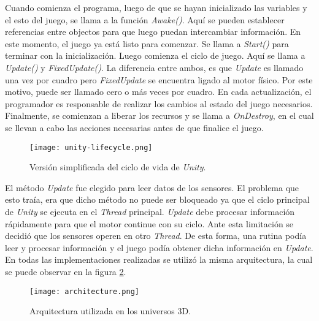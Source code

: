  Cuando comienza el programa, luego de que se hayan inicializado las variables y el esto del juego, se llama a la función \emph{Awake()}. Aquí se pueden establecer referencias entre objectos para que luego puedan intercambiar información. En este momento, el juego ya está listo para comenzar. Se llama a \emph{Start()} para terminar con la inicialización. Luego comienza el ciclo de juego. Aquí se llama a \emph{Update()} y \emph{FixedUpdate()}. La diferencia entre ambos, es que \emph{Update} es llamado una vez por cuadro pero \emph{FixedUpdate} se encuentra ligado al motor físico. Por este motivo, puede ser llamado cero o más veces por cuadro. En cada actualización, el programador es responsable de realizar los cambios al estado del juego necesarios. Finalmente, se comienzan a liberar los recursos y se llama a \emph{OnDestroy}, en el cual se llevan a cabo las acciones necesarias antes de que finalice el juego.

 \begin{figure}[H]
	\centering
    \texttt{[image: unity-lifecycle.png]}
    \caption{Versión simplificada del ciclo de vida de \emph{Unity}.}
	\label{fig:unity-lifecycle}
\end{figure}

El método \emph{Update} fue elegido para leer datos de los sensores. El problema que esto traía, era que dicho método no puede ser bloqueado ya que el ciclo principal de \emph{Unity} se ejecuta en el \emph{Thread} principal. \emph{Update} debe procesar información rápidamente para que el motor continue con su ciclo. Ante esta limitación se decidió que los sensores operen en otro \emph{Thread}. De esta forma, una rutina podía leer y procesar información y el juego podía obtener dicha información en \emph{Update}. En todas las implementaciones realizadas se utilizó la misma arquitectura, la cual se puede observar en la figura  \ref{fig:architecture}.

 \begin{figure}[H]
	\centering
    \texttt{[image: architecture.png]}
    \caption{Arquitectura utilizada en los universos 3D.}
	\label{fig:architecture}
\end{figure}

